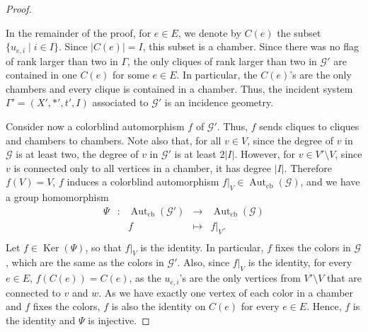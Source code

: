 \documentclass{amsart}
\theoremstyle{definition}
\theoremstyle{remark}
\newcommand{\Aut}{\operatorname{Aut}}
\newcommand{\Autcb}{\Aut_{\text{cb}}}
\newcommand{\Ker}{\operatorname{Ker}}
\newcommand{\G}{\mathcal{G}}
\begin{document}
\begin{proof}
\begin{center}
\end{center}


In the remainder of the proof, for $e\in E$, we denote by $C(e)$ the subset $\{u_{e,i}\mid i\in I\}$. Since $|C(e)|=I$, this subset is a chamber. Since there was no flag of rank larger than two in $\Gamma$, the only cliques of rank larger than two in $\mathcal{G'}$ are contained in one $C(e)$ for some $e\in E$. In particular, the $C(e)$'s are the only chambers and every clique is contained in a chamber. Thus, the incident system $\Gamma'=(X',\ast',t',I)$ associated to $\mathcal{G'}$ is an incidence geometry. 

Consider now a colorblind automorphism $f$ of $\mathcal{G'}$. Thus, $f$ sends cliques to cliques and chambers to chambers.  Note also that, for all $v\in V$, since the degree of $v$ in $\mathcal{G}$ is at least two, the degree of $v$ in $\mathcal{G'}$ is at least $2|I|$. However, for $v\in V'\setminus V$, since $v$ is connected only to all vertices in a chamber, it has degree $|I|$. Therefore $f(V)=V$, $f$ induces a colorblind automorphism $f|_V\in \Autcb(\mathcal{G})$, and we have a group homomorphism 
\[\begin{array}{ccccc}
\Psi & : & \Autcb(\G') & \to & \Autcb(\G) \\
 & & f & \mapsto & f|_V. \\
\end{array}\]
Let $f\in \Ker(\Psi)$, so that $f|_V$ is the identity. In particular, $f$ fixes the colors in $\mathcal{G}$, which are the same as the colors in $\mathcal{G'}$. Also, since $f|_V$ is the identity, for every $e\in E$, $f(C(e))=C(e)$, as the $u_{e,i}$'s are the only vertices from $V'\setminus V$ that are connected to $v$ and $w$. As we have exactly one vertex of each color in a chamber and $f$ fixes the colors, $f$ is also the identity on $C(e)$ for every $e\in E$. Hence, $f$ is the identity and $\Psi$ is injective. 


\end{proof}
\end{document}
